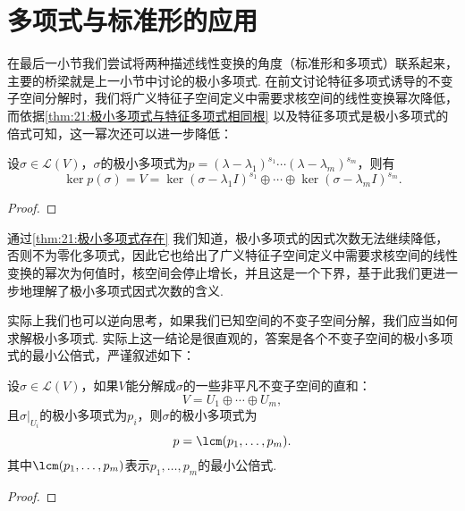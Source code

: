\section{多项式与标准形的应用}

在最后一小节我们尝试将两种描述线性变换的角度（标准形和多项式）联系起来，主要的桥梁就是上一小节中讨论的极小多项式. 在前文讨论特征多项式诱导的不变子空间分解时，我们将广义特征子空间定义中需要求核空间的线性变换幂次降低，而依据\autoref{thm:21:极小多项式与特征多项式相同根} 以及特征多项式是极小多项式的倍式可知，这一幂次还可以进一步降低：
\begin{theorem} \label{thm:21:极小多项式与分解}
    设$\sigma\in \mathcal{L}(V)$，$\sigma$的极小多项式为$p=(\lambda-\lambda_1)^{s_1}\cdots(\lambda-\lambda_m)^{s_m}$，则有
    \[\ker p(\sigma)=V=\ker (\sigma-\lambda_1I)^{s_1}\oplus\cdots\oplus\ker (\sigma-\lambda_mI)^{s_m}.\]
\end{theorem}

\begin{proof}

\end{proof}

通过\autoref{thm:21:极小多项式存在} 我们知道，极小多项式的因式次数无法继续降低，否则不为零化多项式，因此它也给出了广义特征子空间定义中需要求核空间的线性变换的幂次为何值时，核空间会停止增长，并且这是一个下界，基于此我们更进一步地理解了极小多项式因式次数的含义.

实际上我们也可以逆向思考，如果我们已知空间的不变子空间分解，我们应当如何求解极小多项式. 实际上这一结论是很直观的，答案是各个不变子空间的极小多项式的最小公倍式，严谨叙述如下：
\begin{theorem}
    设$\sigma\in\mathcal{L}(V)$，如果$V$能分解成$\sigma$的一些非平凡不变子空间的直和：
    \[V=U_1\oplus\cdots\oplus U_m,\]
    且$\sigma\vert_{U_i}$的极小多项式为$p_i$，则$\sigma$的极小多项式为
    \[p=\lcm(p_1,\ldots,p_m).\]
    其中$\lcm(p_1,\ldots,p_m)$表示$p_1,\ldots,p_m$的最小公倍式.
\end{theorem}

\begin{proof}

\end{proof}

